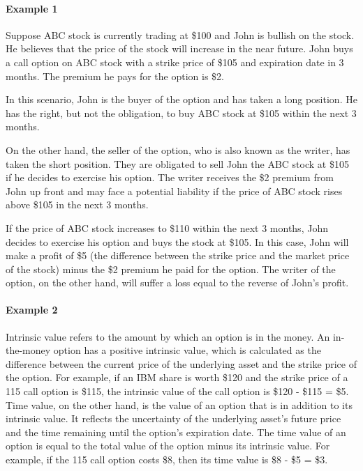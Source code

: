 \documentclass{article}
\theoremstyle{mytheoremstyle}
\theoremstyle{mytheoremstyle}
\theoremstyle{myproblemstyle}
\begin{document}
\paragraph{Example 1}
Suppose ABC stock is currently trading at \$100 and John is bullish on the stock. He believes that the price of the stock will increase in the near future. John buys a call option on ABC stock with a strike price of \$105 and expiration date in 3 months. The premium he pays for the option is \$2.

In this scenario, John is the buyer of the option and has taken a long position. He has the right, but not the obligation, to buy ABC stock at \$105 within the next 3 months.

On the other hand, the seller of the option, who is also known as the writer, has taken the short position. They are obligated to sell John the ABC stock at \$105 if he decides to exercise his option. The writer receives the \$2 premium from John up front and may face a potential liability if the price of ABC stock rises above \$105 in the next 3 months.

If the price of ABC stock increases to \$110 within the next 3 months, John decides to exercise his option and buys the stock at \$105. In this case, John will make a profit of \$5 (the difference between the strike price and the market price of the stock) minus the \$2 premium he paid for the option. The writer of the option, on the other hand, will suffer a loss equal to the reverse of John's profit.


\paragraph{Example 2}
Intrinsic value refers to the amount by which an option is in the money. An in-the-money option has a positive intrinsic value, which is calculated as the difference between the current price of the underlying asset and the strike price of the option. For example, if an IBM share is worth \$120 and the strike price of a 115 call option is \$115, the intrinsic value of the call option is \$120 - \$115 = \$5.
Time value, on the other hand, is the value of an option that is in addition to its intrinsic value. It reflects the uncertainty of the underlying asset's future price and the time remaining until the option's expiration date. The time value of an option is equal to the total value of the option minus its intrinsic value. For example, if the 115 call option costs \$8, then its time value is \$8 - \$5 = \$3.
\end{document}
